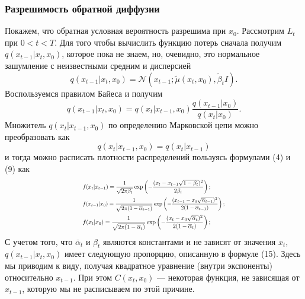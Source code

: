 \documentclass[11pt, a4paper, twocolumn, twoside]{article} %
\begin{document}
\subsubsection{Разрешимость обратной диффузии}

Покажем, что обратная условная вероятность разрешима при $x_0$. Рассмотрим $L_t$ при $0<t<T$. Для того чтобы вычислить функцию потерь сначала получим $q(x_{t-1}| x_t, x_0)$, которое пока не знаем, но, очевидно, это нормальное зашумление с неизвестными средним и дисперсией
\begin{equation*}
	q(x_{t-1}| x_t, x_0) = \mathcal{N}(x_{t-1}; \tilde{\mu}(x_t, x_0), \tilde{\beta}_tI).
\end{equation*}
Воспользуемся правилом Байеса и получим
\begin{equation*}
	q(x_{t-1}| x_t, x_0) = q(x_t|x_{t-1}, x_0)\dfrac{q(x_{t-1}|x_0)}{q(x_t|x_0)}.
\end{equation*}
Множитель $q(x_t|x_{t-1}, x_0)$ по определению Марковской цепи можно преобразовать как
\begin{equation*}
	q(x_t|x_{t-1}, x_0) = q(x_t|x_{t-1})
\end{equation*}
и тогда можно расписать плотности распределений пользуясь формулами (4) и (9) как
\begin{eqnarray*}
\begin{aligned}
	& \resizebox{0.45\textwidth}{!}{$
f(x_t|x_{t-1}) = \dfrac{1}{\sqrt{2\pi\beta_t}}\exp\left(-\dfrac{(x_t-x_{t-1}\sqrt{1-\beta_t})^2}{2\beta_t}\right);
$} \\
	& \resizebox{0.5\textwidth}{!}{$
f(x_{t-1}| x_0) = \dfrac{1}{\sqrt{2\pi(1-\overline\alpha_{t-1})}}\exp\left(-\dfrac{(x_{t-1}-x_0\sqrt{\overline\alpha_{t-1}})^2}{2(1-\overline\alpha_{t-1})}\right);
$} \\
	& \resizebox{0.45\textwidth}{!}{$
f(x_t| x_0) = \dfrac{1}{\sqrt{2\pi(1-\overline\alpha_t)}}\exp\left(-\dfrac{(x_t-x_0\sqrt{\overline\alpha_t})^2}{2(1-\overline\alpha_t)}\right);
$}
\end{aligned}
\end{eqnarray*}
С учетом того, что $\overline\alpha_t$ и $\beta_t$ являются константами и не зависят от значения $x_t$, $q(x_{t-1}| x_t, x_0)$ имеет следующую пропорцию, описанную в формуле (15). Здесь мы приводим к виду, получая квадратное уравнение (внутри экспоненты) относительно $x_{t-1}$. При этом $C(x_t, x_0)$ — некоторая функция, не зависящая от $x_{t-1}$, которую мы не расписываем по этой причине.
\end{document}

